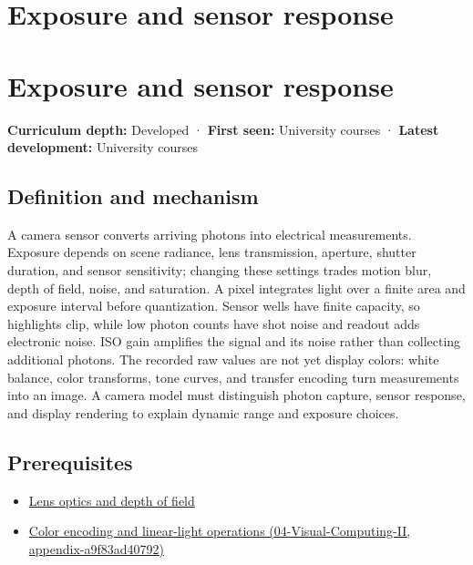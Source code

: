 \hypertarget{appendix-92d45cdf2afc}{}
\section*{Exposure and sensor response}
\section{Exposure and sensor response}\label{appendix-92d45cdf2afc-exposure-and-sensor-response}

\textbf{Curriculum depth:} Developed · \textbf{First seen:} University courses · \textbf{Latest development:} University courses

\subsection{Definition and mechanism}\label{appendix-92d45cdf2afc-definition-and-mechanism}

A camera sensor converts arriving photons into electrical measurements. Exposure depends on scene radiance, lens transmission, aperture, shutter duration, and sensor sensitivity; changing these settings trades motion blur, depth of field, noise, and saturation. A pixel integrates light over a finite area and exposure interval before quantization. Sensor wells have finite capacity, so highlights clip, while low photon counts have shot noise and readout adds electronic noise. ISO gain amplifies the signal and its noise rather than collecting additional photons. The recorded raw values are not yet display colors: white balance, color transforms, tone curves, and transfer encoding turn measurements into an image. A camera model must distinguish photon capture, sensor response, and display rendering to explain dynamic range and exposure choices.

\subsection{Prerequisites}\label{appendix-92d45cdf2afc-prerequisites}

\begin{itemize}
\tightlist
\item
  \hyperref[appendix-21f8456e2629]{Lens optics and depth of field}
\item
  \href{../04-Visual-Computing-II/main.pdf\#nameddest=appendix-a9f83ad40792}{Color encoding and linear-light operations (04-Visual-Computing-II, appendix-a9f83ad40792)}
\end{itemize}

